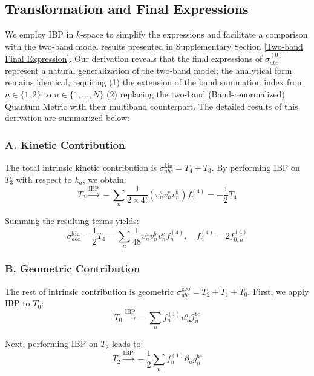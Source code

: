\documentclass[twocolumn, prx, reprint, amsfonts, amsmath, amssymb, longbibliography, floatfix, aps]{revtex4-2}
\begin{document}
\subsection{Transformation and Final Expressions}
We employ IBP in $k$-space to simplify the expressions and facilitate a comparison with the two-band model results presented in Supplementary Section \ref{Two-band Final Expression}. Our derivation reveals that the final expressions of $\sigma^{(0)}_{abc}$ represent a natural generalization of the two-band model; the analytical form remains identical, requiring (1) the extension of the band summation index from $n \in \{1, 2\}$ to $n \in \{1, \dots, N\}$ (2) replacing the two-band (Band-renormalized) Quantum Metric with their multiband counterpart. The detailed results of this derivation are summarized below:

\subsubsection*{A. Kinetic Contribution}
The total intrinsic kinetic contribution is $\sigma^{\text{kin}}_{abc} = T_4 + T_3$.  By performing IBP on $T_3$ with respect to $k_a$, we obtain:
\begin{equation}
	T_3 \xrightarrow{\text{IBP}} -{\textstyle \sum_{n}} \frac{1}{2\times 4!}  (v^a_{n} v^c_{n} v^b_{n})f^{(4)}_n = -\frac{1}{2}T_4
\end{equation}

Summing the resulting terms yields:
\begin{equation}
	\sigma^{\text{kin}}_{abc} = \frac{1}{2}T_4 = {\textstyle \sum_{n}}\frac{1}{48} v^{a}_{n}v^{b}_{n}v^c_{n}f^{(4)}_{n},
    \quad
    f_n^{(4)} = 2 f_{0,n}^{(4)}
\end{equation}


\subsubsection*{B. Geometric Contribution}
The rest of intrinsic contribution is geometric $\sigma^{\text{geo}}_{abc} = T_2 + T_1 + T_0$. First, we apply IBP to $T_0$:
\begin{equation}
	T_0 \xrightarrow{\text{IBP}} - {\textstyle \sum_{n}} f^{(1)}_n v_n^a \mathcal{G}^{bc}_{n} 
\end{equation}

Next, performing IBP on $T_2$ leads to:
\begin{equation}
	T_2 \xrightarrow{\text{IBP}}-\frac{1}{2} {\textstyle \sum_{n}}f^{(1)}_n \partial_{a}g^{bc}_n
\end{equation}
\end{document}
